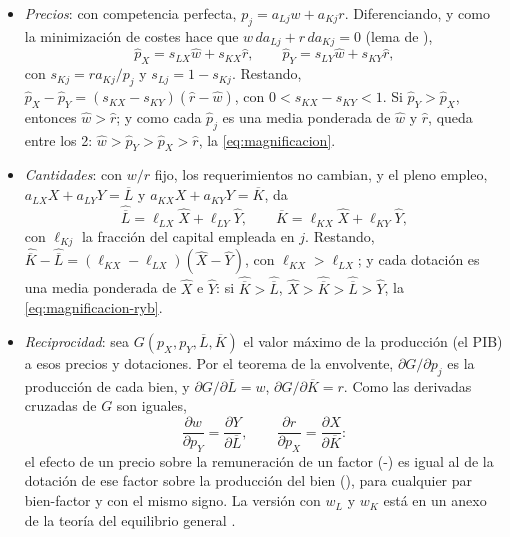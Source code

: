 \documentclass[11pt]{article}
\begin{document}
\begin{itemize}
\item \emph{Precios}: con competencia perfecta, $p_j=a_{Lj}w+a_{Kj}r$. Diferenciando, y como la minimización de costes hace que $w\,da_{Lj}+r\,da_{Kj}=0$ (lema de ),
  \begin{equation}\label{eq:jones-precios}
  \hat p_X=s_{LX}\hat w+s_{KX}\hat r,\qquad \hat p_Y=s_{LY}\hat w+s_{KY}\hat r,
  \end{equation}
  con $s_{Kj}=ra_{Kj}/p_j$ y $s_{Lj}=1-s_{Kj}$. Restando, $\hat p_X-\hat p_Y=(s_{KX}-s_{KY})(\hat r-\hat w)$, con $0<s_{KX}-s_{KY}<1$. Si $\hat p_Y>\hat p_X$, entonces $\hat w>\hat r$; y como cada $\hat p_j$ es una media ponderada de $\hat w$ y $\hat r$, queda entre los 2: $\hat w>\hat p_Y>\hat p_X>\hat r$, la \eqref{eq:magnificacion}.\findemo
\item \emph{Cantidades}: con $w/r$ fijo, los requerimientos no cambian, y el pleno empleo, $a_{LX}X+a_{LY}Y=\overline L$ y $a_{KX}X+a_{KY}Y=\overline K$, da
  \begin{equation}\label{eq:jones-dotaciones}
  \hat{\overline L}=\ell_{LX}\hat X+\ell_{LY}\hat Y,\qquad \hat{\overline K}=\ell_{KX}\hat X+\ell_{KY}\hat Y,
  \end{equation}
  con $\ell_{Kj}$ la fracción del capital empleada en $j$. Restando, $\hat{\overline K}-\hat{\overline L}=(\ell_{KX}-\ell_{LX})(\hat X-\hat Y)$, con $\ell_{KX}>\ell_{LX}$; y cada dotación es una media ponderada de $\hat X$ e $\hat Y$: si $\hat{\overline K}>\hat{\overline L}$, $\hat X>\hat{\overline K}>\hat{\overline L}>\hat Y$, la \eqref{eq:magnificacion-ryb}.\findemo
\item \emph{Reciprocidad}\nocite{Samuelson1953Prices}: sea $G(p_X,p_Y,\overline L,\overline K)$ el valor máximo de la producción (el PIB) a esos precios y dotaciones. Por el teorema de la envolvente, $\partial G/\partial p_j$ es la producción de cada bien, y $\partial G/\partial\overline L=w$, $\partial G/\partial\overline K=r$. Como las derivadas cruzadas de $G$ son iguales,
  \begin{equation}\label{eq:reciprocidad}
  \frac{\partial w}{\partial p_Y}=\frac{\partial Y}{\partial \overline L},\qquad \frac{\partial r}{\partial p_X}=\frac{\partial X}{\partial \overline K}:
  \end{equation}
  el efecto de un precio sobre la remuneración de un factor (-) es igual al de la dotación de ese factor sobre la producción del bien (), para cualquier par bien-factor y con el mismo signo. La versión con $w_L$ y $w_K$ está en un anexo de la teoría del equilibrio general .
\end{itemize}
\end{document}
